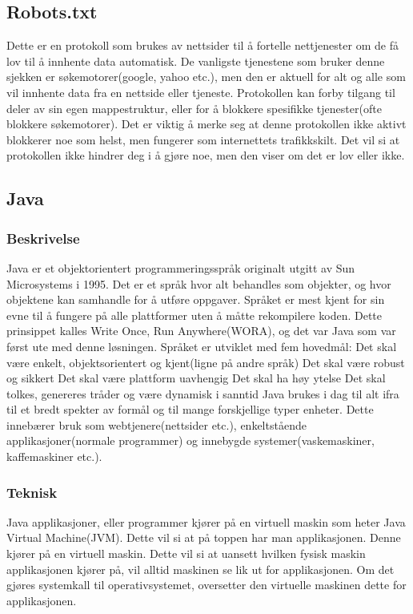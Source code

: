 \documentclass[../main.tex]{subfiles}
\begin{document}
\subsection{Robots.txt}
Dette er en protokoll som brukes av nettsider til å fortelle nettjenester om de få lov til å innhente data automatisk. De vanligste tjenestene som bruker denne sjekken er søkemotorer(google, yahoo etc.), men den er aktuell for alt og alle som vil innhente data fra en nettside eller tjeneste.
Protokollen kan forby tilgang til deler av sin egen mappestruktur, eller for å blokkere spesifikke tjenester(ofte blokkere søkemotorer). Det er viktig å merke seg at denne protokollen ikke aktivt blokkerer noe som helst, men fungerer som internettets trafikkskilt. Det vil si at protokollen ikke hindrer deg i å gjøre noe, men den viser om det er lov eller ikke.

\subsection{Java}
\subsubsection{Beskrivelse}
Java er et objektorientert programmeringsspråk originalt utgitt av Sun Microsystems i 1995. Det er et språk hvor alt behandles som objekter, og hvor objektene kan samhandle for å utføre oppgaver. Språket er mest kjent for sin evne til å fungere på alle plattformer uten å måtte rekompilere koden. Dette prinsippet kalles Write Once, Run Anywhere(WORA), og det var Java som var først ute med denne løsningen.
Språket er utviklet med fem hovedmål:
Det skal være enkelt, objektsorientert og kjent(ligne på andre språk)
Det skal være robust og sikkert
Det skal være plattform uavhengig
Det skal ha høy ytelse
Det skal tolkes, genereres tråder og være dynamisk i sanntid
Java brukes i dag til alt ifra til et bredt spekter av formål og til mange forskjellige typer enheter. Dette innebærer bruk som webtjenere(nettsider etc.), enkeltstående applikasjoner(normale programmer) og innebygde systemer(vaskemaskiner, kaffemaskiner etc.). 

\subsubsection{Teknisk}
Java applikasjoner, eller programmer kjører på en virtuell maskin som heter Java Virtual Machine(JVM). Dette vil si at på toppen har man applikasjonen. Denne kjører på en virtuell maskin. Dette vil si at uansett hvilken fysisk maskin applikasjonen kjører på, vil alltid maskinen se lik ut for applikasjonen. Om det gjøres systemkall til operativsystemet, oversetter den virtuelle maskinen dette for applikasjonen.
\end{document}
